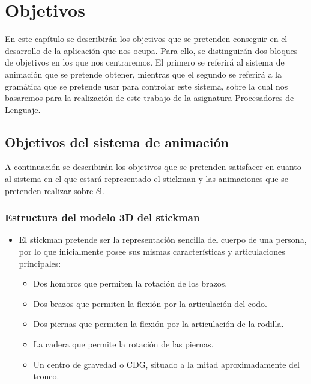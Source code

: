 \chapter{Objetivos}

En este capítulo se describirán los objetivos que se pretenden conseguir en el desarrollo de la aplicación que nos ocupa. Para ello, se distinguirán dos bloques de objetivos en los que nos centraremos. El primero se referirá al sistema de animación que se pretende obtener, mientras que el segundo se referirá a la gramática que se pretende usar para controlar este sistema, sobre la cual nos basaremos para la realización de este trabajo de la asignatura Procesadores de Lenguaje.

\section{Objetivos del sistema de animación}

A continuación se describirán los objetivos que se pretenden satisfacer en cuanto al sistema en el que estará representado el stickman y las animaciones que se pretenden realizar sobre él. \\

\subsection{Estructura del modelo 3D del stickman}

\begin{itemize}
\item El stickman pretende ser la representación sencilla del cuerpo de una persona, por lo que inicialmente posee sus mismas características y articulaciones principales:  \\

  \begin{itemize}
  \item Dos hombros que permiten la rotación de los brazos.
  \item Dos brazos que permiten la flexión por la articulación del codo.
  \item Dos piernas que permiten la flexión por la articulación de la rodilla.
  \item La cadera que permite la rotación de las piernas.
  \item Un centro de gravedad o CDG, situado a la mitad aproximadamente del tronco.
  \end{itemize}
\end{itemize}

